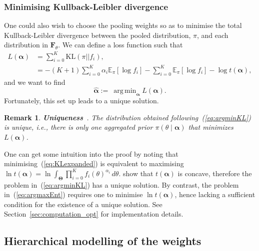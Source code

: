 \documentclass[a4paper, notitlepage, 10pt]{article}
\DeclareMathOperator*{\argmin}{arg\,min}
\newtheorem{remark}{Remark}[]
\begin{document}
\subsubsection{Minimising Kullback-Leibler divergence}
\label{sec:minKL}

One could also wish to choose the pooling weights so as to minimise the total Kullback-Leibler divergence between the pooled distribution, $\pi$, and each distribution in $\mathbf{F}_{\theta}$.
We can define a loss function such that
\begin{align}
\nonumber
L(\boldsymbol\alpha) &= \sum_{i=0}^K  \text{KL}(\pi || f_i), \\
\label{eq:KLexpanded}
     &= - (K+1) \sum_{i=0}^K\alpha_i\mathbb{E}_\pi [\log f_i ]  - \sum_{i=0}^K \mathbb{E}_\pi\left[\log f_i\right] - \log t(\boldsymbol\alpha), 
\end{align}
and we want to find 
\begin{equation}
\label{eq:argminKL}
    \hat{\boldsymbol\alpha}:= \:\argmin_{\boldsymbol\alpha} L(\boldsymbol\alpha).   
\end{equation}
Fortunately, this set up leads to a unique solution.

\begin{remark}
\label{remark:uniqueness}
\textbf{Uniqueness}~\citep{Rufo2012A}.
 The distribution obtained following~(\ref{eq:argminKL}) is unique, i.e., there is only one aggregated prior $\pi(\theta \mid \boldsymbol\alpha)$ that minimizes $L(\boldsymbol\alpha)$.
\end{remark}
One can get some intuition into the proof by noting that minimising~(\ref{eq:KLexpanded}) is equivalent to maximising $\ln t(\boldsymbol\alpha) = \ln\int_{\boldsymbol\Theta}\prod_{i=0}^{K}f_i(\theta)^{\alpha_i}\, d\theta$. 
\cite{Rufo2012A} show that $t(\boldsymbol\alpha)$ is concave, therefore the problem in~(\ref{eq:argminKL}) has a unique solution.
By contrast, the problem in~(\ref{eq:argmaxEnt}) requires one to minimise $\ln t(\boldsymbol\alpha)$, hence lacking a sufficient condition for the existence of a unique solution.
See Section~\ref{sec:computation_opt} for implementation details.

\subsection{Hierarchical modelling of the weights}
\label{sec:hierPrior}
\end{document}
